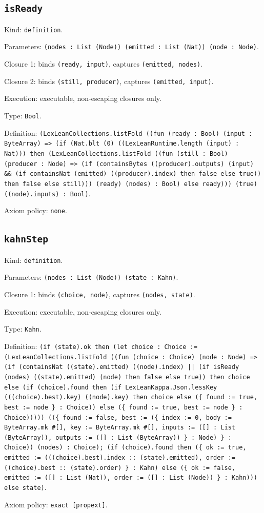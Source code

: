 \documentclass[11pt]{article}
\begin{document}
\subsection*{\texttt{isReady}}
\noindent Kind: \texttt{definition}.\par
\noindent Parameters: \texttt{(nodes : List (Node)) (emitted : List (Nat)) (node : Node)}.\par
\noindent Closure 1: binds \texttt{(ready, input)}, captures \texttt{(emitted, nodes)}.\par
\noindent Closure 2: binds \texttt{(still, producer)}, captures \texttt{(emitted, input)}.\par
\noindent Execution: executable, non-escaping closures only.\par
\noindent Type: \texttt{Bool}.\par
\noindent Definition: \texttt{(LexLeanCollections.listFold ((fun (ready : Bool) (input : ByteArray) => (if (Nat.blt (0) ((LexLeanRuntime.length (input) : Nat))) then (LexLeanCollections.listFold ((fun (still : Bool) (producer : Node) => (if (containsBytes ((producer).outputs) (input) \&\& (if containsNat (emitted) ((producer).index) then false else true)) then false else still))) (ready) (nodes) : Bool) else ready))) (true) ((node).inputs) : Bool)}.\par
\noindent Axiom policy: \texttt{none}.\par
\subsection*{\texttt{kahnStep}}
\noindent Kind: \texttt{definition}.\par
\noindent Parameters: \texttt{(nodes : List (Node)) (state : Kahn)}.\par
\noindent Closure 1: binds \texttt{(choice, node)}, captures \texttt{(nodes, state)}.\par
\noindent Execution: executable, non-escaping closures only.\par
\noindent Type: \texttt{Kahn}.\par
\noindent Definition: \texttt{(if (state).ok then (let choice : Choice := (LexLeanCollections.listFold ((fun (choice : Choice) (node : Node) => (if (containsNat ((state).emitted) ((node).index) || (if isReady (nodes) ((state).emitted) (node) then false else true)) then choice else (if (choice).found then (if LexLeanKappa.Json.lessKey (((choice).best).key) ((node).key) then choice else (\{ found := true, best := node \} : Choice)) else (\{ found := true, best := node \} : Choice))))) ((\{ found := false, best := (\{ index := 0, body := ByteArray.mk \#[], key := ByteArray.mk \#[], inputs := ([] : List (ByteArray)), outputs := ([] : List (ByteArray)) \} : Node) \} : Choice)) (nodes) : Choice); (if (choice).found then (\{ ok := true, emitted := (((choice).best).index :: (state).emitted), order := ((choice).best :: (state).order) \} : Kahn) else (\{ ok := false, emitted := ([] : List (Nat)), order := ([] : List (Node)) \} : Kahn))) else state)}.\par
\noindent Axiom policy: \texttt{exact [propext]}.\par
\end{document}
